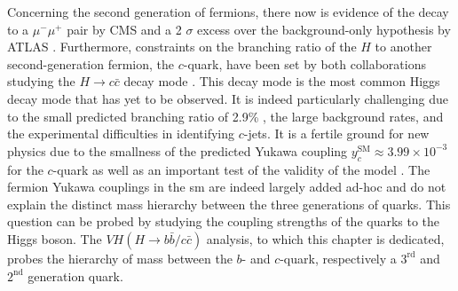 Concerning the second generation of fermions, there now is evidence of the decay to a $\mu^-\mu^+$ pair by CMS \cite{CMS:2020xwi} and a 2 $\sigma$ excess over the background-only hypothesis by ATLAS \cite{ATLAS:2020fzp}. Furthermore, constraints on the branching ratio of the $H$ to another second-generation fermion, the $c$-quark, have been set by both collaborations studying the $H \rightarrow c\bar{c}$ decay mode \cite{Aaboud:2018fhh}. This decay mode is the most common Higgs decay mode that has yet to be observed. It is indeed particularly challenging due to the small predicted branching ratio of 2.9\% \cite{DJOUADI199856}, the large background rates, and the experimental difficulties in identifying $c$-jets. It is a fertile ground for new physics  due to the smallness of the predicted Yukawa coupling $y^{\textrm{SM}}_c \approx 3.99 \times 10^{-3} $ \cite{yukawac} for the $c$-quark as well as an important test of the validity of the model \cite{PhysRevD.89.033014,PhysRevD.92.033016,Botella:2016krk,PhysRevD.98.055001,GHOSH2016504,PhysRevLett.123.031802,PhysRevD.100.115041}. The fermion Yukawa couplings in the \gls{sm} are indeed largely added ad-hoc and do not explain the distinct mass hierarchy between the three generations of quarks. This question can be probed by studying the coupling strengths of the quarks to the Higgs boson. The $VH (H \rightarrow b\bar{b}/c\bar{c})$ analysis, to which this chapter is dedicated, probes the hierarchy of mass between the $b$- and $c$-quark, respectively a $3^{\textrm{rd}}$ and $2^{\textrm{nd}}$ generation quark.

